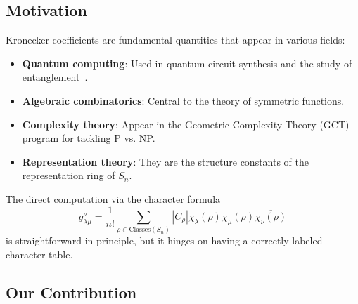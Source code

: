 \documentclass[11pt]{article}
\theoremstyle{definition}
\theoremstyle{remark}
\begin{document}
\subsection{Motivation}

Kronecker coefficients are fundamental quantities that appear in various fields:
\begin{itemize}
\item \textbf{Quantum computing}: Used in quantum circuit synthesis and the study of entanglement~\cite{ibm2024}.
\item \textbf{Algebraic combinatorics}: Central to the theory of symmetric functions.
\item \textbf{Complexity theory}: Appear in the Geometric Complexity Theory (GCT) program for tackling P vs. NP.
\item \textbf{Representation theory}: They are the structure constants of the representation ring of $S_n$.
\end{itemize}

The direct computation via the character formula
\begin{equation}
g^\nu_{\lambda\mu} = \frac{1}{n!} \sum_{\rho \in \text{Classes}(S_n)} |C_\rho| \chi_\lambda(\rho) \chi_\mu(\rho) \overline{\chi_\nu(\rho)}
\end{equation}
is straightforward in principle, but it hinges on having a correctly labeled character table.

\subsection{Our Contribution}
\end{document}
